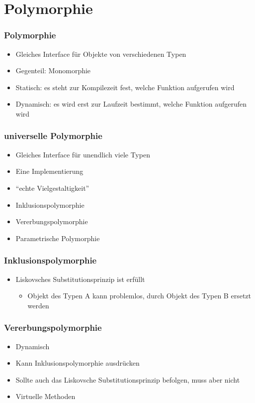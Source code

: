 \section{Polymorphie}


\begin{frame}
	\frametitle{Polymorphie}
	\begin{itemize}
		\item Gleiches Interface für Objekte von verschiedenen Typen
		\item Gegenteil: Monomorphie
	\end{itemize}
	
	\begin{itemize}
		\item Statisch: es steht zur Kompilezeit fest, welche Funktion aufgerufen wird
		\item Dynamisch: es wird erst zur Laufzeit bestimmt, welche Funktion aufgerufen wird
	\end{itemize}
\end{frame}


\begin{frame}
	\frametitle{universelle Polymorphie}
	\begin{itemize}
		\item Gleiches Interface für unendlich viele Typen
		\item Eine Implementierung
		\item ``echte Vielgestaltigkeit''
		\item Inklusionspolymorphie
		\item Vererbungspolymorphie
		\item Parametrische Polymorphie
	\end{itemize}
\end{frame}


\begin{frame}
	\frametitle{Inklusionspolymorphie}
	\begin{itemize}
		\item Liskovsches Substitutionsprinzip ist erfüllt
		\begin{itemize}
			\item Objekt des Typen A kann problemlos, durch Objekt des Typen B ersetzt werden 
		\end{itemize}
	\end{itemize}
\end{frame}


\begin{frame}
	\frametitle{Vererbungspolymorphie}
	\begin{itemize}
		\item Dynamisch
		\item Kann Inklusionspolymorphie ausdrücken
		\item Sollte auch das Liskovsche Substitutionsprinzip befolgen, muss aber nicht
		\item Virtuelle Methoden
	\end{itemize}
\end{frame}



